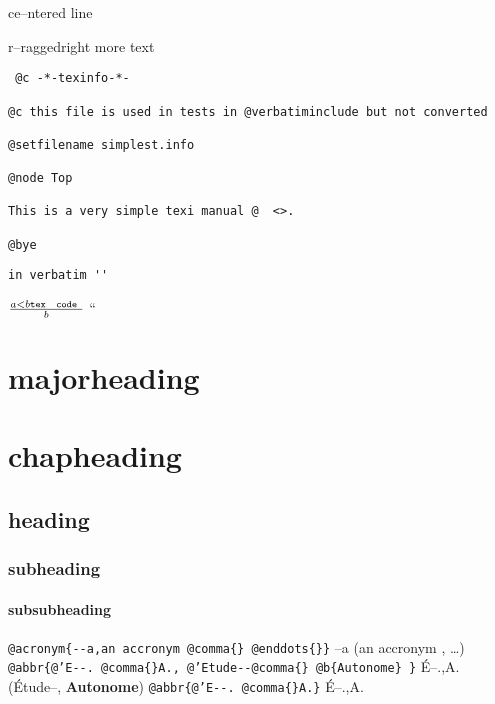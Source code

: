 \documentclass{book}
\newcommand{\Texinfoplaceholder}[1]{}
\newcommand{\Texinfonopagebreakheading}[2]{{\let\clearpage\relax \let\cleardoublepage\relax \let\thispagestyle\Texinfoplaceholder #1{#2}}}
\renewcommand{\_}{\Texinfounderscore\discretionary{}{}{}}
\begin{document}
\begin{titlepage}
\begin{center}
ce--ntered line
\end{center}

\begin{flushleft}
r--raggedright
more text
\end{flushleft}

\begin{verbatim}
 @c -*-texinfo-*-

@c this file is used in tests in @verbatiminclude but not converted

@setfilename simplest.info

@node Top

This is a very simple texi manual @  <>.

@bye
\end{verbatim}

\begin{verbatim}
in verbatim ''
\end{verbatim}





$\frac{a < b \texttt{tex \hbox{ code }}}{b}$ ``

\Texinfonopagebreakheading{\chapter*}{{majorheading}}

\Texinfonopagebreakheading{\chapter*}{{chapheading}}

\section*{{heading}}

\subsection*{{subheading}}

\subsubsection*{{subsubheading}}


\texttt{@acronym\{{-}{-}a,an accronym @comma\{\}\ @enddots\{\}\}} --a (an accronym , \dots{})
\texttt{@abbr\{@'E{-}{-}.\ @comma\{\}A.,\ @'Etude{-}{-}@comma\{\}\ @b\{Autonome\}\ \}} \'{E}--.\@ ,A.\@ (\'{E}tude--, \textbf{Autonome})
\texttt{@abbr\{@'E{-}{-}.\ @comma\{\}A.\}} \'{E}--.\@ ,A.\@


\end{titlepage}
\end{document}
